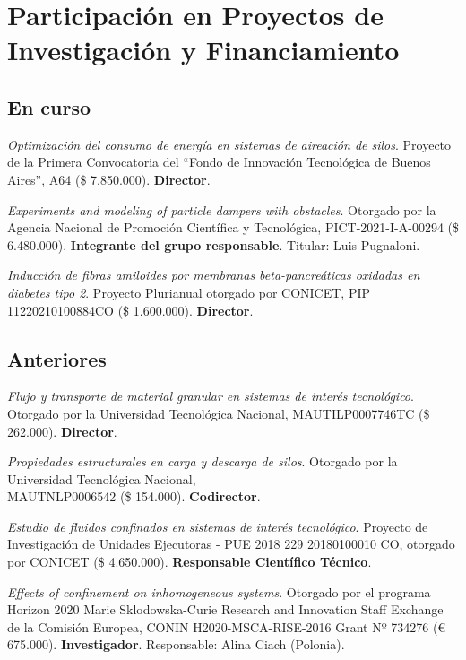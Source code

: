 \section{Participación en Proyectos de Investigación y Financiamiento}
\subsection{En curso}

 \textit{Optimización del consumo de energía en sistemas de aireación de silos}. Proyecto de la Primera Convocatoria del ``Fondo de Innovación Tecnológica de Buenos Aires'', A64 (\$ 7.850.000). \textbf{Director}.

 \textit{Experiments and modeling of particle dampers with obstacles}. Otorgado por la Agencia Nacional de Promoción Científica y Tecnológica, PICT-2021-I-A-00294 (\$ 6.480.000). \textbf{Integrante del grupo responsable}. Titular: Luis Pugnaloni.

 \textit{Inducción de fibras amiloides por membranas beta-pancreáticas oxidadas en diabetes tipo 2}. Proyecto Plurianual otorgado por CONICET, PIP 11220210100884CO (\$ 1.600.000). \textbf{Director}.


\subsection{Anteriores}

 \textit{Flujo y transporte de material granular en sistemas de interés tecnológico}. Otorgado por la Universidad Tecnológica Nacional, MAUTILP0007746TC (\$ 262.000). \textbf{Director}.

 \textit{Propiedades estructurales en carga y descarga de silos}. Otorgado por la Universidad Tecnológica Nacional,\\ MAUTNLP0006542 (\$ 154.000). \textbf{Codirector}.

 \textit{Estudio de fluidos confinados en sistemas de interés tecnológico}. Proyecto de Investigación de Unidades Ejecutoras - PUE 2018 229 20180100010 CO, otorgado por CONICET (\$ 4.650.000). \textbf{Responsable Científico Técnico}.

 \textit{Effects of confinement on inhomogeneous systems}. Otorgado por el programa Horizon 2020 Marie Sklodowska-Curie Research and Innovation Staff Exchange de la Comisión Europea, CONIN H2020-MSCA-RISE-2016 Grant Nº 734276 (€ 675.000). \textbf{Investigador}. Responsable: Alina Ciach (Polonia).

